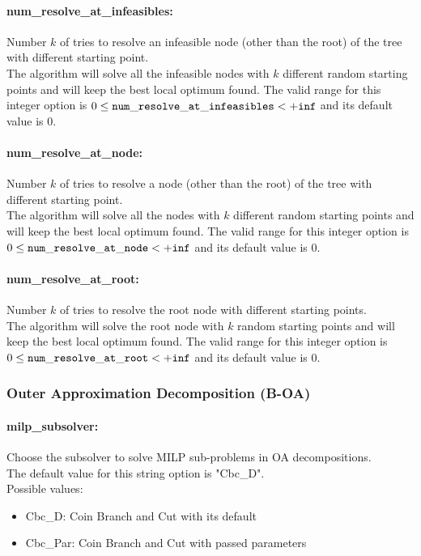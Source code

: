 \paragraph{num\_resolve\_at\_infeasibles:}\label{sec:num_resolve_at_infeasibles} Number $k$ of tries to resolve an infeasible node (other than the root) of the tree with different starting point. $\;$ \\
 The algorithm will solve all the infeasible nodes
with $k$ different random starting points and
will keep the best local optimum found. The valid range for this integer option is
$0 \le {\tt num\_resolve\_at\_infeasibles } <  {\tt +inf}$
and its default value is $0$.


\paragraph{num\_resolve\_at\_node:}\label{sec:num_resolve_at_node} Number $k$ of tries to resolve a node (other than the root) of the tree with different starting point. $\;$ \\
 The algorithm will solve all the nodes with $k$
different random starting points and will keep
the best local optimum found. The valid range for this integer option is
$0 \le {\tt num\_resolve\_at\_node } <  {\tt +inf}$
and its default value is $0$.


\paragraph{num\_resolve\_at\_root:}\label{sec:num_resolve_at_root} Number $k$ of tries to resolve the root node with different starting points. $\;$ \\
 The algorithm will solve the root node with $k$
random starting points and will keep the best
local optimum found. The valid range for this integer option is
$0 \le {\tt num\_resolve\_at\_root } <  {\tt +inf}$
and its default value is $0$.


\subsubsection{Outer Approximation Decomposition (B-OA)}
\label{sec:Outer_Approximation_Decomposition_(B-OA)}

\paragraph{milp\_subsolver:}\label{sec:milp_subsolver} Choose the subsolver to solve MILP sub-problems in OA decompositions. $\;$ \\
The default value for this string option is "Cbc\_D".
\\ 
Possible values:
\begin{itemize}
   \item Cbc\_D: Coin Branch and Cut with its default
   \item Cbc\_Par: Coin Branch and Cut with passed parameters
\end{itemize}

